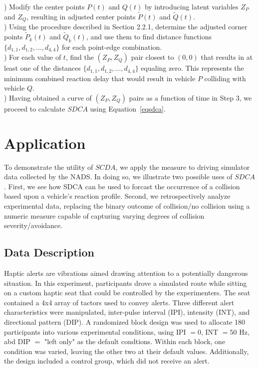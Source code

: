 \documentclass{article}
\begin{document}
) Modify the center points $P(t)$ and $Q(t)$ by introducing latent variables $Z_P$ and $Z_Q$, resulting in adjusted center points $\tilde{P}(t)$ and $\tilde{Q}(t)$. \\

) Using the procedure described in Section 2.2.1, determine the adjusted corner points $\tilde{P}_k(t)$ and $\tilde{Q}_k(t)$, and use them to find distance functions $\{d_{1,1}, d_{1,2}, ..., d_{4,4}\}$ for each point-edge combination. \\

) For each value of $t$, find the $(Z_P, Z_Q)$ pair closest to $(0,0)$ that results in at least one of the distances $\{d_{1,1}, d_{1,2}, ..., d_{4,4}\}$ equaling zero. This represents the minimum combined reaction delay that would result in vehicle $P$ colliding with vehicle $Q$. \\

) Having obtained a curve of $(Z_P, Z_Q)$ pairs as a function of time in Step 3, we proceed to calculate $SDCA$ using Equation~\eqref{eqsdca}.

\section{Application}

To demonstrate the utility of $SCDA$, we apply the measure to driving simulator data collected by the NADS. In doing so, we illustrate two possible uses of $SDCA$. First, we see how SDCA can be used to forcast the occurrence of a collision based upon a vehicle's reaction profile. Second, we retrospectively analyze experimental data, replacing the binary outcome of collision/no collision using a numeric measure capable of capturing varying degrees of collision severity/avoidance.

\subsection{Data Description}

Haptic alerts are vibrations aimed drawing attention to a potentially dangerous situation. In this experiment, participants drove a simulated route while sitting on a custom haptic seat that could be controlled by the experimenters. The seat contained a 4x4 array of tactors used to convey alerts. Three different alert characteristics were manipulated, inter-pulse interval (IPI), intensity (INT), and directional pattern (DIP).  A randomized block design was used to allocate 180 participants into various experimental conditions, using IPI $= 0$, INT $= 50$ Hz, abd DIP $=$ "left only" as the default  condtions.  Within each block, one condition was varied, leaving the other two at their default values.  Additionally, the design included a control group, which did not receive an alert.
\end{document}
